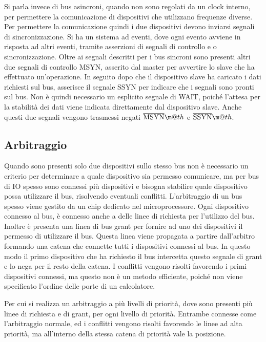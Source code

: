 \documentclass{article}
\makeatletter
\newcommand*{\textoverline}[1]{$\overline{\hbox{#1}}\m@th$}
\numberwithin{equation}{subsection}
\makeatother
\begin{document}
Si parla invece di bus asincroni, quando non sono regolati da un clock interno, per permettere la comunicazione di dispositivi che utilizzano frequenze diverse. Per permettere 
la comunicazione quindi i due dispositivi devono inviarsi segnali di sincronizzazione. Si ha un sistema ad eventi, dove ogni evento avviene in risposta ad altri eventi, 
tramite asserzioni di segnali di controllo e o sincronizzazione. Oltre ai segnali descritti per i bus sincroni sono presenti altri due segnali di controllo MSYN, asserito 
dal master per avvertire lo slave che ha effettuato un'operazione. In seguito dopo che il dispositivo slave ha caricato i dati richiesti sul bus, asserisce il segnale 
SSYN per indicare che i segnali sono pronti sul bus. Non è quindi necessario un esplicito segnale di WAIT, poiché l'attesa per la stabilità dei dati viene indicata 
direttamente dal dispositivo slave. Anche questi due segnali vengono trasmessi negati \textoverline{MSYN} e \textoverline{SSYN}. 


\subsection{Arbitraggio}

Quando sono presenti solo due dispositivi sullo stesso bus non è necessario un criterio per determinare a quale dispositivo sia permesso comunicare, ma per bus di IO spesso 
sono connessi più dispositivi e bisogna stabilire quale dispositivo possa utilizzare il bus, risolvendo eventuali conflitti. 
L'arbitraggio di un bus spesso viene gestito da un chip dedicato nel microprocessore. Ogni dispositivo connesso al bus, è connesso anche a delle linee di richiesta per 
l'utilizzo del bus. Inoltre è presenta una linea di bus grant per fornire ad uno dei dispositivi il permesso di utilizzare il bus. Questa linea viene propagata a partire 
dall'arbitro formando una catena che connette tutti i dispositivi connessi al bus. In questo modo il primo dispositivo che ha richiesto il bus intercetta questo segnale di 
grant e lo nega per il resto della catena. 
I conflitti vengono risolti favorendo i primi dispositivi connessi, ma questo non è un metodo efficiente, poiché non viene specificato l'ordine delle porte 
di un calcolatore. 

Per cui si realizza un arbitraggio a più livelli di priorità, dove sono presenti più linee di richiesta e di grant, per ogni livello di priorità. Entrambe connesse 
come l'arbitraggio normale, ed i conflitti vengono risolti favorendo le linee ad alta priorità, ma all'interno della stessa catena di priorità vale la posizione. 
\end{document}
